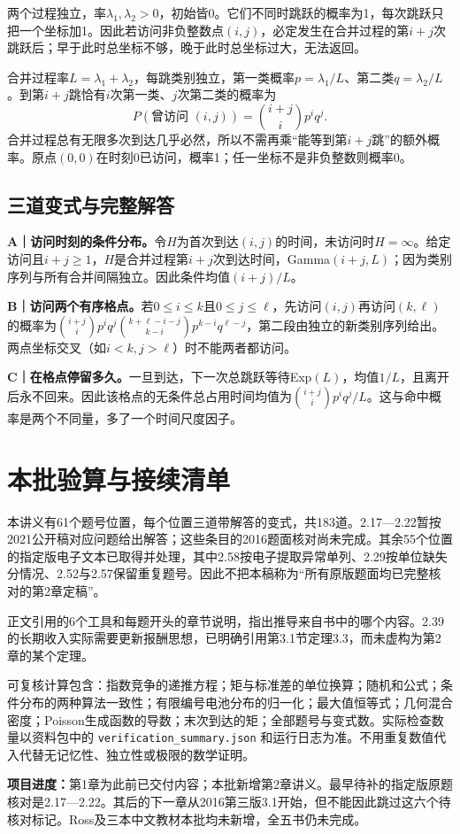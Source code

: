 \documentclass[
  11pt,
  a4paper,
  UTF8,fontset=fandol]{ctexart}
\let\OldSection\section
\renewcommand{\section}{\Needspace{7\baselineskip}\OldSection}
\let\OldSubsection\subsection
\renewcommand{\subsection}{\Needspace{5\baselineskip}\OldSubsection}
\begin{document}
两个过程独立，率\(\lambda_1,\lambda_2>0\)，初始皆0。它们不同时跳跃的概率为1，每次跳跃只把一个坐标加1。因此若访问非负整数点\((i,j)\)，必定发生在合并过程的第\(i+j\)次跳跃后；早于此时总坐标不够，晚于此时总坐标过大，无法返回。

合并过程率\(L=\lambda_1+\lambda_2\)，每跳类别独立，第一类概率\(p=\lambda_1/L\)、第二类\(q=\lambda_2/L\)。到第\(i+j\)跳恰有\(i\)次第一类、\(j\)次第二类的概率为
\[\boxed{P(\text{曾访问 }(i,j))=\binom{i+j}{i}p^iq^j.}\]
合并过程总有无限多次到达几乎必然，所以不需再乘``能等到第\(i+j\)跳''的额外概率。原点\((0,0)\)在时刻0已访问，概率1；任一坐标不是非负整数则概率0。

\subsection{三道变式与完整解答}\label{ux4e09ux9053ux53d8ux5f0fux4e0eux5b8cux6574ux89e3ux7b54-60}

\textbf{A｜访问时刻的条件分布。}令\(H\)为首次到达\((i,j)\)的时间，未访问时\(H=\infty\)。给定访问且\(i+j\ge1\)，\(H\)是合并过程第\(i+j\)次到达时间，Gamma\((i+j,L)\)；因为类别序列与所有合并间隔独立。因此条件均值\((i+j)/L\)。

\textbf{B｜访问两个有序格点。}若\(0\le i\le k\)且\(0\le j\le\ell\)，先访问\((i,j)\)再访问\((k,\ell)\)的概率为\(\binom{i+j}{i}p^iq^j\binom{k+\ell-i-j}{k-i}p^{k-i}q^{\ell-j}\)，第二段由独立的新类别序列给出。两点坐标交叉（如\(i<k,j>\ell\)）时不能两者都访问。

\textbf{C｜在格点停留多久。}一旦到达，下一次总跳跃等待Exp\((L)\)，均值\(1/L\)，且离开后永不回来。因此该格点的无条件总占用时间均值为\(\binom{i+j}{i}p^iq^j/L\)。这与命中概率是两个不同量，多了一个时间尺度因子。

\newpage

\section{本批验算与接续清单}\label{ux672cux6279ux9a8cux7b97ux4e0eux63a5ux7eedux6e05ux5355}

本讲义有61个题号位置，每个位置三道带解答的变式，共183道。2.17---2.22暂按2021公开稿对应问题给出解答；这些条目的2016题面核对尚未完成。其余55个位置的指定版电子文本已取得并处理，其中2.58按电子提取异常单列、2.29按单位缺失分情况、2.52与2.57保留重复题号。因此不把本稿称为``所有原版题面均已完整核对的第2章定稿''。

正文引用的6个工具和每题开头的章节说明，指出推导来自书中的哪个内容。2.39的长期收入实际需要更新报酬思想，已明确引用第3.1节定理3.3，而未虚构为第2章的某个定理。

可复核计算包含：指数竞争的递推方程；矩与标准差的单位换算；随机和公式；条件分布的两种算法一致性；有限编号电池分布的归一化；最大值恒等式；几何混合密度；Poisson生成函数的导数；末次到达的矩；全部题号与变式数。实际检查数量以资料包中的
\texttt{verification\_summary.json}
和运行日志为准。不用重复数值代入代替无记忆性、独立性或极限的数学证明。

\textbf{项目进度：}第1章为此前已交付内容；本批新增第2章讲义。最早待补的指定版原题核对是2.17---2.22。其后的下一章从2016第三版3.1开始，但不能因此跳过这六个待核对标记。Ross及三本中文教材本批均未新增，全五书仍未完成。
\end{document}
